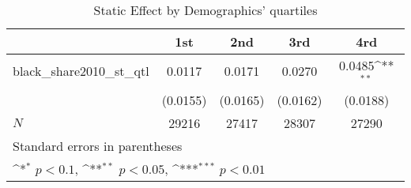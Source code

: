 \begin{table}[htbp]\centering
\def\sym#1{\ifmmode^{#1}\else\(^{#1}\)\fi}
\caption{Static Effect by Demographics' quartiles}
\begin{tabular}{l*{4}{c}}
\hline\hline
            &\multicolumn{1}{c}{1st}&\multicolumn{1}{c}{2nd}&\multicolumn{1}{c}{3rd}&\multicolumn{1}{c}{4rd}\\
\hline
black\_share2010\_st\_qtl&      0.0117         &      0.0171         &      0.0270         &      0.0485\sym{**} \\
            &    (0.0155)         &    (0.0165)         &    (0.0162)         &    (0.0188)         \\
\hline
\(N\)       &       29216         &       27417         &       28307         &       27290         \\
\hline\hline
\multicolumn{5}{l}{\footnotesize Standard errors in parentheses}\\
\multicolumn{5}{l}{\footnotesize \sym{*} \(p<0.1\), \sym{**} \(p<0.05\), \sym{***} \(p<0.01\)}\\
\end{tabular}
\end{table}
